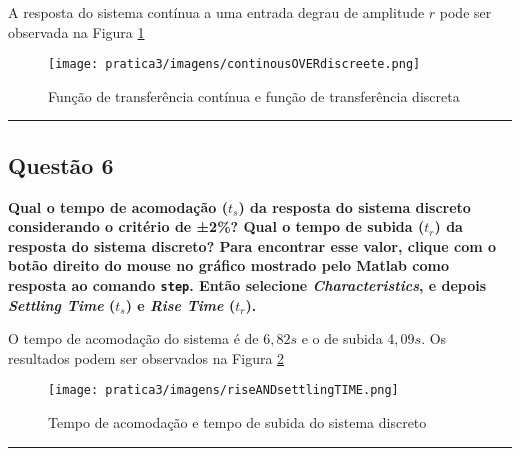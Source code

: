 A resposta do sistema contínua a uma entrada degrau de amplitude \(r\) pode ser observada na Figura \ref{fig:contOVERdisc}

\begin{figure}[H]
    \centering
    \texttt{[image: pratica3/imagens/continousOVERdiscreete.png]}
    \caption{Função de transferência contínua e função de transferência discreta}
    \label{fig:contOVERdisc}
\end{figure}

\vspace{10pt}
\hrule

\subsection{Questão 6}
\textbf{Qual o tempo de acomodação (\( t_s \)) da resposta do sistema discreto considerando o critério de ±2\%? Qual o tempo de subida (\( t_r \)) da resposta do sistema discreto? Para encontrar esse valor, clique com o botão direito do mouse no gráfico mostrado pelo Matlab como resposta ao comando \texttt{step}. Então selecione \textit{Characteristics}, e depois \textit{Settling Time} (\( t_s \)) e \textit{Rise Time} (\( t_r \)).}

O tempo de acomodação do sistema é de $6,82s$ e o de subida $4,09s$. Os resultados podem ser observados na Figura \ref{fig:rise-settling-time}

\begin{figure}[H]
    \centering
    \texttt{[image: pratica3/imagens/riseANDsettlingTIME.png]}
    \caption{Tempo de acomodação e tempo de subida do sistema discreto}
    \label{fig:rise-settling-time}
\end{figure}
\vspace{10pt}
\hrule

